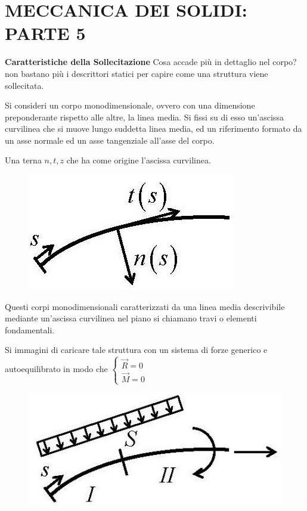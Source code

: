 \documentclass{article}
\begin{document}
	\section*{MECCANICA DEI SOLIDI: PARTE 5} %


\begin{adjustwidth}{2in}{} 
{\Large \textbf{Caratteristiche della Sollecitazione}} \mbox{} \newline
	Cosa accade più in dettaglio nel corpo? non bastano più i descrittori statici per capire come una struttura viene sollecitata. \newline 
	
	Si consideri un corpo monodimensionale, ovvero con una dimensione preponderante rispetto alle altre, la linea media.
	Si fissi su di esso un’ascissa curvilinea che si muove lungo suddetta linea media, ed un riferimento formato da un asse normale ed un asse
	tangenziale all’asse del corpo. \newline 
	
	Una terna $n, t, z$ che ha come origine l'ascissa curvilinea.
	
\begin{figure}[H]
	\centering
	\includegraphics[width=0.15\linewidth]{"immagini/1.PARTE5_Pagina_02 (2)"}
\end{figure}

	Questi corpi monodimensionali caratterizzati da una linea media descrivibile mediante un'ascissa curvilinea nel piano si chiamano travi o elementi fondamentali. \newline
	
	Si immagini di caricare tale struttura con un sistema di forze generico e autoequilibrato in modo che \(\begin{cases} \vec{R} = 0 \\ \vec {M} = 0\end{cases}\) \newline	
	
\begin{figure}[H]
	\centering
	\includegraphics[width=0.15\linewidth]{"immagini/1.PARTE5_Pagina_02"}
\end{figure}



\end{adjustwidth}
\end{document}
